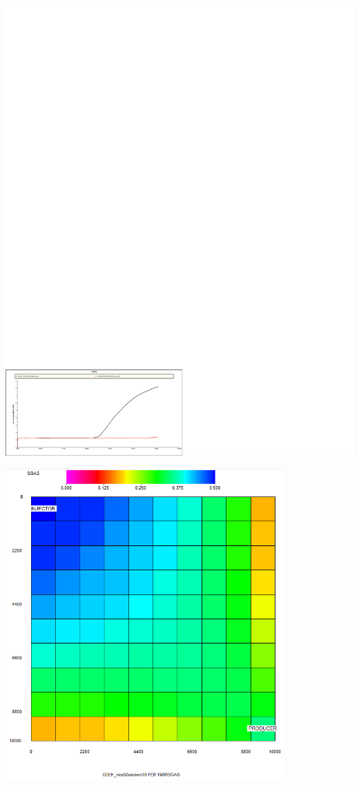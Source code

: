 \centerline{\includegraphics[clip=true, trim=0cm 0cm 10.6cm 22.6cm,width=1.3\textwidth]{graphics/wgor_comb.pdf}}

\centerline{\includegraphics[width=0.8\textwidth]{graphics/grid_sgas_z1.PNG}}

